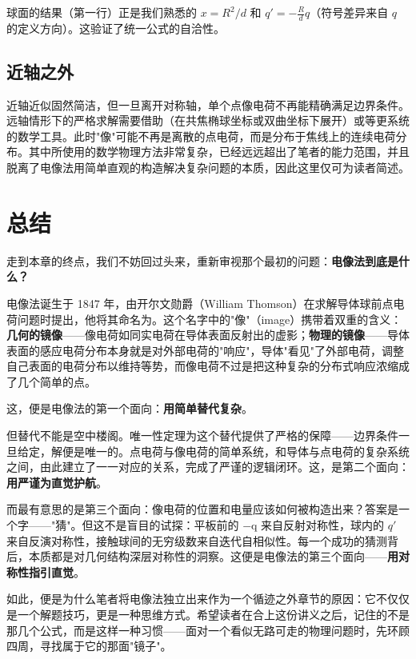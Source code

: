 球面的结果（第一行）正是我们熟悉的 $x = R^2/d$ 和 $q' = -\frac{R}{d}q$（符号差异来自 $q$ 的定义方向）。这验证了统一公式的自洽性。

\subsection{近轴之外}

近轴近似固然简洁，但一旦离开对称轴，单个点像电荷不再能精确满足边界条件。远轴情形下的严格求解需要借助（在共焦椭球坐标或双曲坐标下展开）或等更系统的数学工具。此时"像"可能不再是离散的点电荷，而是分布于焦线上的连续电荷分布。其中所使用的数学物理方法非常复杂，已经远远超出了笔者的能力范围，并且脱离了电像法用简单直观的构造解决复杂问题的本质，因此这里仅可为读者简述。


\section{总结}

走到本章的终点，我们不妨回过头来，重新审视那个最初的问题：\textbf{电像法到底是什么？}

电像法诞生于 1847 年，由开尔文勋爵（William Thomson）在求解导体球前点电荷问题时提出，他将其命名为。这个名字中的"像"（image）携带着双重的含义：\textbf{几何的镜像}——像电荷如同实电荷在导体表面反射出的虚影；\textbf{物理的镜像}——导体表面的感应电荷分布本身就是对外部电荷的"响应"，导体"看见"了外部电荷，调整自己表面的电荷分布以维持等势，而像电荷不过是把这种复杂的分布式响应浓缩成了几个简单的点。

这，便是电像法的第一个面向：\textbf{用简单替代复杂}。

但替代不能是空中楼阁。唯一性定理为这个替代提供了严格的保障——边界条件一旦给定，解便是唯一的。点电荷与像电荷的简单系统，和导体与点电荷的复杂系统之间，由此建立了一一对应的关系，完成了严谨的逻辑闭环。这，是第二个面向：\textbf{用严谨为直觉护航}。

而最有意思的是第三个面向：像电荷的位置和电量应该如何被构造出来？答案是一个字——"猜"。但这不是盲目的试探：平板前的 $-$q 来自反射对称性，球内的 $q'$ 来自反演对称性，接触球间的无穷级数来自迭代自相似性。每一个成功的猜测背后，本质都是对几何结构深层对称性的洞察。这便是电像法的第三个面向——\textbf{用对称性指引直觉}。

如此，便是为什么笔者将电像法独立出来作为一个循迹之外章节的原因：它不仅仅是一个解题技巧，更是一种思维方式。希望读者在合上这份讲义之后，记住的不是那几个公式，而是这样一种习惯——面对一个看似无路可走的物理问题时，先环顾四周，寻找属于它的那面"镜子"。

\let\thesection\oldthesection
\let\thesubsection\oldthesubsection
